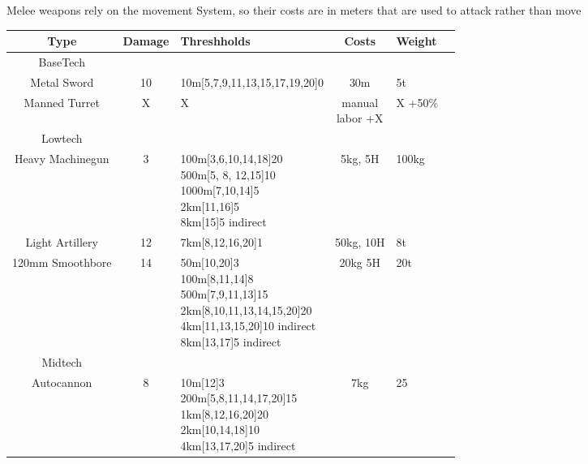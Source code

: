 Melee weapons rely on the movement System, so their costs are in meters that are used to attack rather than move\par
\begin{tabular}{c|clcll}
    Type & Damage & Threshholds & Costs & Weight\\
    \hline BaseTech&&&&&\\
    Metal Sword & 10 & 10m[5,7,9,11,13,15,17,19,20]0 & 30m & 5t \\
    Manned Turret & X & X & \makecell[l]{manual \\labor +X} &  X +50\% \\
    \hline Lowtech &&&&&\\
    Heavy Machinegun & 3 & \makecell[l]{100m[3,6,10,14,18]20\\
                                        500m[5, 8, 12,15]10\\
                                        1000m[7,10,14]5\\
                                        2km[11,16]5\\
                                        8km[15]5 indirect}
                                            & 5kg, 5H & 100kg \\
    Light Artillery & 12 & 7km[8,12,16,20]1 & 50kg, 10H & 8t  \\
    120mm Smoothbore & 14 & \makecell[l]{50m[10,20]3\\
                                        100m[8,11,14]8\\
                                        500m[7,9,11,13]15\\
                                        2km[8,10,11,13,14,15,20]20\\
                                        4km[11,13,15,20]10 indirect\\
                                        8km[13,17]5 indirect}
                                            & 20kg 5H & 20t \\
    \hline Midtech &&&&&\\
    Autocannon & 8 & \makecell[l]{10m[12]3\\
                                  200m[5,8,11,14,17,20]15\\
                                  1km[8,12,16,20]20\\
                                  2km[10,14,18]10 \\
                                  4km[13,17,20]5 indirect }
                                        & 7kg & 25 \\
\end{tabular}\par
